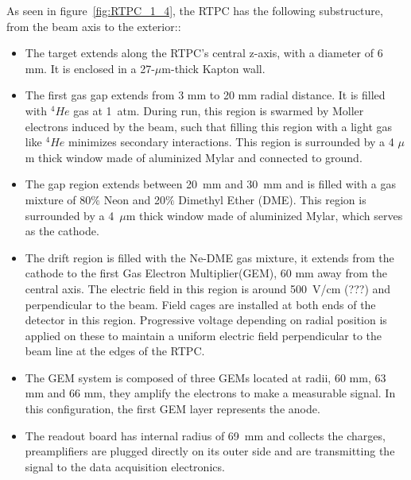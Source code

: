 \documentclass[twocolumn,showpacs,superscriptaddress,groupedaddress]{revtex4}
\begin{document}
As seen in figure~\ref{fig:RTPC_1_4}, the RTPC has the following substructure, 
from the beam axis to the exterior::\\
\begin{itemize}
   \item The target extends along the RTPC's central z-axis, with a diameter of 
      6 mm. It is enclosed in a 27-$\mu$m-thick Kapton wall.

   \item The first gas gap extends from 3 mm to 20 mm radial distance. It is 
   filled with $^{4}He$ gas at 1~atm. During run, this region is swarmed by 
   Moller electrons induced by the beam, such that filling this region with a 
   light gas like $^{4}He$ minimizes secondary interactions. This region is 
   surrounded by a 4 $\mu$m thick window made of aluminized Mylar and connected 
to ground.                                                                 

   \item The gap region extends between 20~mm and 30~mm and is filled with a 
      gas mixture of 80$\%$ Neon and 20$\%$ Dimethyl Ether (DME).  This region 
      is surrounded by a 4~$\mu$m thick window made of aluminized Mylar, which 
      serves as the cathode.

   \item The drift region is filled with the Ne-DME gas mixture, it extends 
      from the cathode to the first Gas Electron Multiplier(GEM), 60 mm away 
      from the central axis. The electric field in this region is around 
      500~V/cm (???) and perpendicular to the beam. Field cages are installed 
      at both ends of the detector in this region. Progressive voltage 
      depending on radial position is applied on these to maintain a uniform 
      electric field perpendicular to the beam line at the edges of the RTPC.
   
   \item The GEM system is composed of three GEMs located at radii, 60 mm, 63 
      mm and 66 mm, they amplify the electrons to make a measurable signal. In 
      this configuration, the first GEM layer represents the anode.

   \item The readout board has internal radius of 69~mm and collects the 
      charges, preamplifiers are plugged directly on its outer side and are 
      transmitting the signal to the data acquisition electronics.
\end{itemize}
\end{document}
